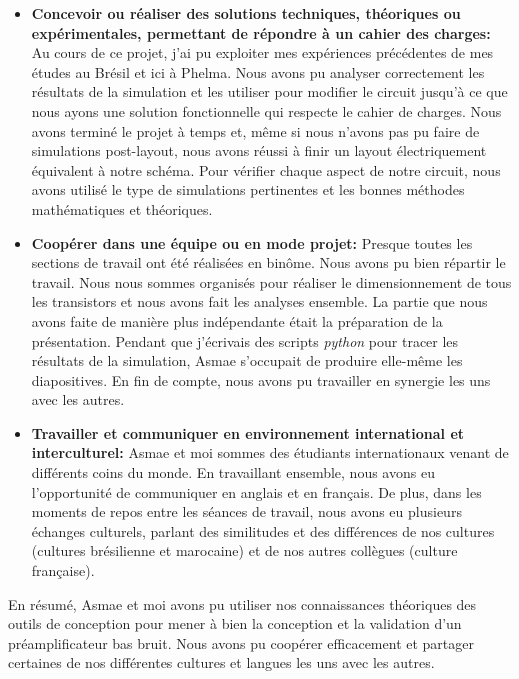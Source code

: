 \documentclass[a4paper,12pt]{article}
\numberwithin{equation}{section}
\newcommand{\?}{\stackrel{?}{=}}
\begin{document}
\begin{itemize}
    \item\textbf{Concevoir ou réaliser des solutions techniques, théoriques ou expérimentales, permettant de répondre à un cahier des charges:} Au cours de ce projet, j'ai pu exploiter mes expériences précédentes de mes études au Brésil et ici à Phelma. Nous avons pu analyser correctement les résultats de la simulation et les utiliser pour modifier le circuit jusqu'à ce que nous ayons une solution fonctionnelle qui respecte le cahier de charges. Nous avons terminé le projet à temps et, même si nous n'avons pas pu faire de simulations post-layout, nous avons réussi à finir un layout électriquement équivalent à notre schéma. Pour vérifier chaque aspect de notre circuit, nous avons utilisé le type de simulations pertinentes et les bonnes méthodes mathématiques et théoriques.

    \item\textbf{Coopérer dans une équipe ou en mode projet:} Presque toutes les sections de travail ont été réalisées en binôme. Nous avons pu bien répartir le travail. Nous nous sommes organisés pour réaliser le dimensionnement de tous les transistors et nous avons fait les analyses ensemble. La partie que nous avons faite de manière plus indépendante était la préparation de la présentation. Pendant que j'écrivais des scripts \textit{python} pour tracer les résultats de la simulation, Asmae s'occupait de produire elle-même les diapositives. En fin de compte, nous avons pu travailler en synergie les uns avec les autres.

    \item\textbf{Travailler et communiquer en environnement international et interculturel:} Asmae et moi sommes des étudiants internationaux venant de différents coins du monde. En travaillant ensemble, nous avons eu l'opportunité de communiquer en anglais et en français. De plus, dans les moments de repos entre les séances de travail, nous avons eu plusieurs échanges culturels, parlant des similitudes et des différences de nos cultures (cultures brésilienne et marocaine) et de nos autres collègues (culture française).
\end{itemize}

En résumé, Asmae et moi avons pu utiliser nos connaissances théoriques des outils de conception pour mener à bien la conception et la validation d'un préamplificateur bas bruit. Nous avons pu coopérer efficacement et partager certaines de nos différentes cultures et langues les uns avec les autres.

\newpage
\renewcommand{\thesection}{N}
\printendnotes[itemize]



\end{document}
